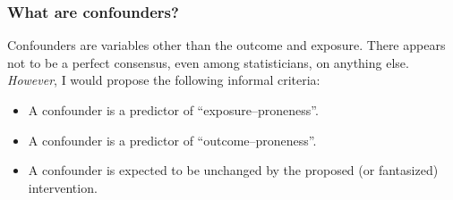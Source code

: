 \documentclass[11pt]{beamer}
\begin{document}
\begin{frame}
\frametitle{What are confounders?}

Confounders are variables other than the outcome and exposure.
There appears not to be a perfect consensus, even among statisticians, on anything else.
\textit{However}, I would propose the following informal criteria:

\begin{itemize}

\item<2-> A confounder is a predictor of ``exposure--proneness''.

\item<3-> A confounder is a predictor of ``outcome--proneness''.

\item<4-> A confounder is expected to be unchanged by the proposed (or fantasized) intervention.

\end{itemize}



\end{frame}
\end{document}
